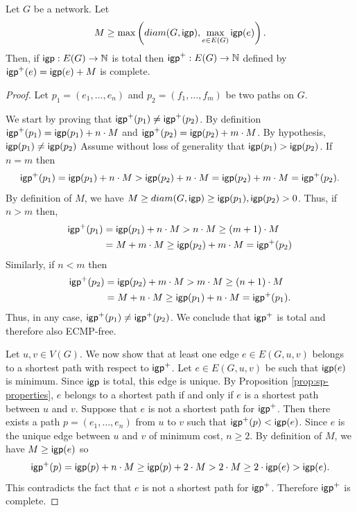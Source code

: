 \begin{lemma}
\label{lemma:totalToComplete}
Let $G$ be a network. Let 
$$
M \geq \max \left( diam(G, \mathsf{igp}), \displaystyle \max_{e \in E(G)} \mathsf{igp}(e) \right).
$$
Then, if $\mathsf{igp} : E(G) \rightarrow \mathbb{N}$ is total then 
$\mathsf{igp}^+ : E(G) \rightarrow \mathbb{N}$ defined by $\mathsf{igp}^+(e) = \mathsf{igp}(e) + M$ is complete.
\end{lemma}

\begin{proof}
Let $p_1 = (e_1, \ldots, e_n)$ and $p_2 = (f_1, \ldots, f_m)$ be two paths on $G$. 

We start by proving that $\mathsf{igp}^+(p_1) \neq \mathsf{igp}^+(p_2)$. By definition
$\mathsf{igp}^+(p_1) = \mathsf{igp}(p_1) + n \cdot M$ and $\mathsf{igp}^+(p_2) = \mathsf{igp}(p_2) + m \cdot M$. By hypothesis, 
$\mathsf{igp}(p_1) \neq \mathsf{igp}(p_2)$ Assume without loss of generality that $\mathsf{igp}(p_1) > \mathsf{igp}(p_2)$. If $n = m$ then
\begin{align*}
\mathsf{igp}^+(p_1) = \mathsf{igp}(p_1) + n \cdot M > \mathsf{igp}(p_2) + n \cdot M = \mathsf{igp}(p_2) + m \cdot M = \mathsf{igp}^+(p_2).
\end{align*}
By definition of $M$, we have $M \geq diam(G, \mathsf{igp}) \geq \mathsf{igp}(p_1), \mathsf{igp}(p_2) > 0$. Thus, if $n > m$ then,
\begin{align*}
\mathsf{igp}^+(p_1) & = \mathsf{igp}(p_1) + n \cdot M > n \cdot M \geq (m + 1) \cdot M \\
& = M + m \cdot M \geq \mathsf{igp}(p_2) + m \cdot M = \mathsf{igp}^+(p_2)
\end{align*}
Similarly, if $n < m$ then
\begin{align*}
\mathsf{igp}^+(p_2) & = \mathsf{igp}(p_2) + m \cdot M > m \cdot M \geq (n + 1) \cdot M \\
& = M + n \cdot M \geq \mathsf{igp}(p_1) + n \cdot M = \mathsf{igp}^+(p_1).
\end{align*}
Thus, in any case, $\mathsf{igp}^+(p_1) \neq \mathsf{igp}^+(p_2)$. We conclude that $\mathsf{igp}^+$ is total
and therefore also ECMP-free.

Let $u, v \in V(G)$. We now show that at least one edge $e \in E(G, u, v)$ belongs to a shortest path with respect to $\mathsf{igp}^+$.
Let $e \in E(G, u, v)$ be such that $\mathsf{igp}(e)$ is minimum. Since $\mathsf{igp}$ is total, this edge is unique. 
By Proposition \ref{prop:sp-properties}, $e$ belongs to a shortest path if and only if $e$ is a shortest path between
$u$ and $v$. Suppose that $e$ is not a shortest path for $\mathsf{igp}^+$. Then there exists a path $p = (e_1, \ldots, e_n)$ from $u$ to $v$ such that
$\mathsf{igp}^+(p) < \mathsf{igp}(e)$. Since $e$ is the unique edge between $u$ and $v$ of minimum cost, $n \geq 2$. By definition of $M$, we have $M \geq \mathsf{igp}(e)$ so 
\begin{align*}
\mathsf{igp}^+(p) = \mathsf{igp}(p) + n \cdot M \geq \mathsf{igp}(p) + 2 \cdot M > 2 \cdot M \geq 2 \cdot \mathsf{igp}(e) > \mathsf{igp}(e).
\end{align*}
This contradicts the fact that $e$ is not a shortest path for $\mathsf{igp}^+$. Therefore $\mathsf{igp}^+$ is complete.
\end{proof}


